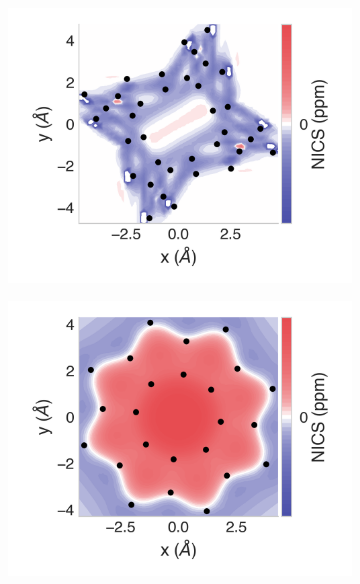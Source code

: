 \documentclass[
	fontsize=10pt, %
	twoside=true, %
	numbers=noenddot, %
]{kaobook}
\begin{document}
\begin{figure}[h]
\begin{subfigure}{5.5cm}\centering\includegraphics{asn12-2d}\end{subfigure}
\begin{subfigure}{5.5cm}\centering\includegraphics{p08-2d}\end{subfigure}%

\end{figure}
\end{document}
